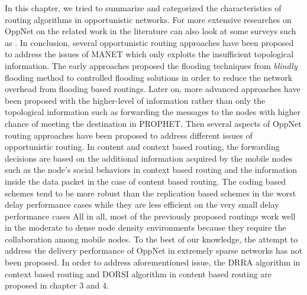In this chapter, we tried to summarize and categorized the characteristics of routing algorithms in opportunistic networks.
For more extensive researches on OppNet on the related work in the literature can also look at some surveys such as \cite{Yue2013, Souza2010, Poonguzharselvi2013a, Nousiainen2013, Behrouz2013, Wahid2014}.
In conclusion, several opportunistic routing approaches have been proposed to address the issues of MANET which only exploits the insufficient topological information.
The early approaches proposed the flooding techniques from \emph{blindly} flooding method to controlled flooding solutions in order to reduce the network overhead from flooding based routings.
Later on, more advanced approaches have been proposed with the higher-level of information rather than only the topological information such as forwarding the messages to the nodes with higher chance of meeting the destination in PROPHET.
Then several aspects of OppNet routing approaches have been proposed to address different issues of opportunistic routing.
In content and context based routing, the forwarding decisions are based on the additional information acquired by the mobile nodes such as the node's social behaviors in context based routing and the information inside the data packet in the case of content based routing. 
The coding based schemes tend to be more robust than the replication based schemes in the worst delay performance cases while they are less efficient on the very small delay performance cases
All in all, most of the previously proposed routings work well in the moderate to dense node density environments because they require the collaboration among mobile nodes.
To the best of our knowledge, the attempt to address the delivery performance of OppNet in extremely sparse networks has not been proposed.
In order to address aforementioned issue, the DRRA algorithm in context based routing and DORSI algorithm in content based routing are proposed in chapter 3 and 4.





























